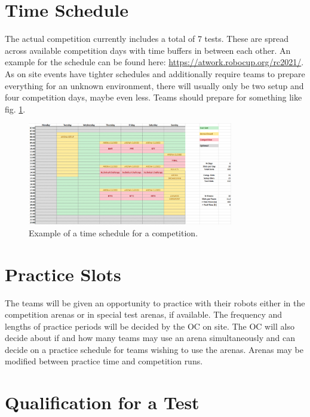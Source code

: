 \section{Time Schedule}

The actual competition currently includes a total of 7 tests.
These are spread across available competition days with time buffers in between each other.
An example for the schedule can be found here: \url{https://atwork.robocup.org/rc2021/}.
As on site events have tighter schedules and additionally require teams to prepare everything for an unknown environment, there will usually only be two setup and four competition days, maybe even less.
Teams should prepare for something like fig. \ref{fig:example_schedule}. 

\begin{figure}[h!]
\centering
\includegraphics[width= 0.8\textwidth ]{./images/competition/example_schedule}
\caption{Example of a time schedule for a \RCAW competition.}
\label{fig:example_schedule}
\end{figure}


\section{Practice Slots}

The teams will be given an opportunity to practice with their robots either in the competition arenas or in special test arenas, if available. The frequency and lengths of practice periods will be decided by the OC on site. The OC will also decide about if and how many teams may use an arena simultaneously and can decide on a practice schedule for teams wishing to use the arenas. Arenas may be modified between practice time and competition runs.


\section{Qualification for a Test}
\label{sec:qulaification for a test}

